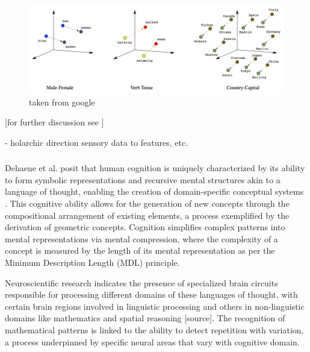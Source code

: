 \begin{figure}
    \centering
    \includegraphics[width=\textwidth]{../img/embeddings_analogies.png}
    \caption{taken from google}
    \label{fig:emb_space}
\end{figure}




[for further discussion see ]

- holarchic direction sensory data to features, etc. 





\subsubsection{}

Dehaene et al. posit that human cognition is uniquely characterized by its ability to form symbolic representations and recursive mental structures akin to a language of thought, enabling the creation of domain-specific conceptual systems \cite{dehaene_symbols_2022}. This cognitive ability allows for the generation of new concepts through the compositional arrangement of existing elements, a process exemplified by the derivation of geometric concepts. Cognition simplifies complex patterns into mental representations via mental compression, where the complexity of a concept is measured by the length of its mental representation as per the Minimum Description Length (MDL) principle.

Neuroscientific research indicates the presence of specialized brain circuits responsible for processing different domains of these languages of thought, with certain brain regions involved in linguistic processing and others in non-linguistic domains like mathematics and spatial reasoning [source]. The recognition of mathematical patterns is linked to the ability to detect repetition with variation, a process underpinned by specific neural areas that vary with cognitive domain.

